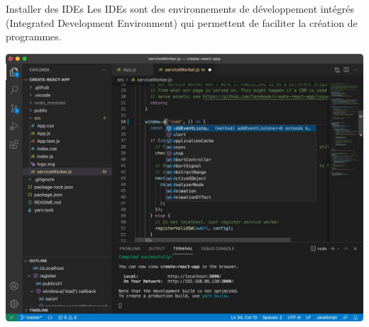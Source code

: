 \begin{frame}[fragile]{Installer des IDEs}
  Les IDEs sont des environnements de développement intégrés (Integrated Development Environment) qui permettent de faciliter la création de programmes.
  \begin{center}
    \includegraphics[width=\textwidth]{img/vscode.png}
  \end{center}
\end{frame}

